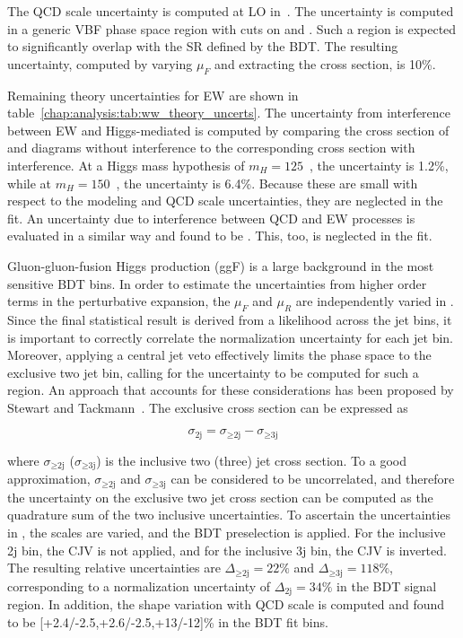 The QCD scale uncertainty is computed at LO
in~\cite{bib:Jager:2006zc}. The uncertainty is computed in a generic
VBF phase space region with cuts on \dyjj and \mjj. Such a region is
expected to significantly overlap with the SR defined by the BDT. The
resulting uncertainty, computed by varying $\mu_F$ and extracting the
cross section, is 10\%.

Remaining theory uncertainties for EW \ww are shown in
table~\ref{chap:analysis:tab:ww_theory_uncerts}. The uncertainty from
interference
between EW \ww and Higgs-mediated \ww is computed by comparing the
cross section of \ww and \hww diagrams without interference to the
corresponding cross section with interference. At a Higgs mass
hypothesis of $m_H = 125$~\gev, the uncertainty is 1.2\%, while at
$m_H = 150$~\gev, the uncertainty is 6.4\%. Because these are small
with respect to the modeling and QCD scale uncertainties, they are
neglected in the fit. An uncertainty due to interference between QCD
and EW \ww processes is evaluated in a similar way and found to
be . This, too, is neglected in the fit.

Gluon-gluon-fusion Higgs production (ggF) is a large background in the
most sensitive BDT bins. In order to estimate the uncertainties from
higher order terms in the perturbative expansion, the $\mu_F$ and
$\mu_R$ are independently varied in \MCFM. Since the final statistical
result is derived from a likelihood across the jet bins, it is
important to correctly correlate the normalization uncertainty for
each jet bin. Moreover, applying a central jet veto effectively limits
the phase space to the exclusive two jet bin, calling for the
uncertainty to be computed for such a region. An approach that
accounts for these considerations has been proposed by Stewart and
Tackmann~\cite{bib:Stewart:2011cf}. The exclusive cross section can be
expressed as 

\begin{equation}
\sigma_{\textrm{2j}} = \sigma_{\geq\textrm{2j}} - \sigma_{\geq\textrm{3j}}
\end{equation}

where $\sigma_{\geq\textrm{2j}}$ ($\sigma_{\geq\textrm{3j}}$) is the
inclusive two (three) jet cross section. To a good approximation,
$\sigma_{\geq\textrm{2j}}$ and $\sigma_{\geq\textrm{3j}}$ can be
considered to be uncorrelated, and therefore the uncertainty on the
exclusive two jet cross section can be computed as the quadrature sum
of the two inclusive uncertainties. To ascertain the uncertainties
in \MCFM, the scales are varied, and the BDT preselection is
applied. For the inclusive 2j bin, the CJV is not applied, and for the
inclusive 3j bin, the CJV is inverted. The resulting relative
uncertainties are $\Delta_{\geq\textrm{2j}} = 22\%$ and
$\Delta_{\geq\textrm{3j}} = 118\%$, corresponding to a normalization
uncertainty of $\Delta_{\textrm{2j}} = 34\%$ in the BDT signal
region. In addition, the shape variation with QCD scale is computed
and found to be [+2.4/-2.5,+2.6/-2.5,+13/-12]\% in the BDT fit
bins. 

